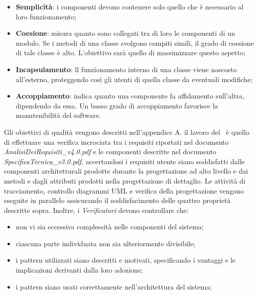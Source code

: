 \begin{itemize}
	\item \textbf{Semplicità}: i componenti devono contenere solo quello che è necessario al loro funzionamento;
	\item \textbf{Coesione}: misura quanto sono collegati tra di loro le componenti di un modulo. Se i metodi di una classe svolgono compiti simili, il grado di coesione di tale classe è alto. L'obiettivo sarà quello di massimizzare questo aspetto;
	\item \textbf{Incapsulamento}: ll funzionamento interno di una classe viene nascosto all'esterno, proteggendo così gli utenti di quella classe da eventuali modifiche;
	\item \textbf{Accoppiamento}: indica quanto una componente fa affidamento sull'altra, dipendendo da essa. Un basso grado di accoppiamento favorisce la manutenibilità del software.
\end{itemize}
Gli obiettivi di qualità vengono descritti nell'appendice A. il lavoro del  \ruoloVerificatore\ è quello di effettuare una verifica incrociata tra i requisiti riportati nel documento\textit{ AnalisiDeiRequisiti\_v4.0.pdf} e le componenti descritte nel documento \textit{SpecificaTecnica\_v3.0.pdf}, accertandosi  i requisiti utente siano soddisfatti  dalle componenti architetturali prodotte durante la progettazione ad alto livello e dai metodi e dagli attributi prodotti nella progettazione di dettaglio.
Le attività di tracciamento, controllo diagrammi UML e verifica della progettazione vengono eseguite in parallelo assicurando il soddisfacimento delle quattro proprietà descritte sopra. Inoltre, i \textit{Verificatori} devono controllare che:

\begin{itemize}
	\item non vi sia eccessiva complessità nelle componenti del sistema;
	\item ciascuna parte individuata non sia ulteriormente divisibile;
	\item i pattern utilizzati siano descritti e motivati, specificando i vantaggi e le implicazioni derivanti dalla loro adozione;
	\item i pattern siano usati correttamente nell'architettura del sistema;
\end{itemize}

